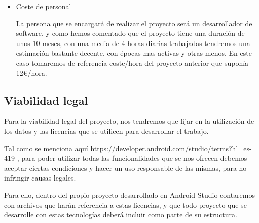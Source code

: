 \begin{itemize}

\item Coste de personal
	
	La persona que se encargará de realizar el proyecto será un desarrollador de software, y como hemos comentado que el proyecto tiene una duración de unos 10 meses, con una media de 4 horas diarias trabajadas tendremos una estimación bastante decente, con épocas mas activas y otras menos. En este caso tomaremos de referencia coste/hora del proyecto anterior que suponía 12€/hora.

\end{itemize}

\subsection{Viabilidad legal}

Para la viabilidad legal del proyecto, nos tendremos que fijar en la utilización de los datos y las licencias que se utilicen para desarrollar el trabajo.

Tal como se menciona aquí https://developer.android.com/studio/terms?hl=es-419 , para poder utilizar todas las funcionalidades que se nos ofrecen debemos aceptar ciertas condiciones y hacer un uso responsable de las mismas, para no infringir causas legales.

Para ello, dentro del propio proyecto desarrollado en Android Studio contaremos con archivos que harán referencia a estas licencias, y que todo proyecto que se desarrolle con estas tecnologías deberá incluir como parte de su estructura.



